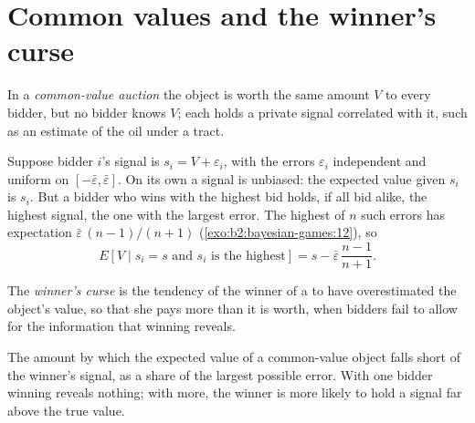 \section{Common values and the winner's curse}\label{sec:b2:bayesian-games:common}

\begin{definition}\label{def:b2:bayesian-games:common-value}
In a \emph{common-value auction} the object is worth the same amount $V$ to every bidder,
but no bidder knows $V$; each holds a private signal correlated with it, such as an estimate of the oil under a tract.
\end{definition}

Suppose bidder $i$'s signal is $s_i = V + \varepsilon_i$, with the errors $\varepsilon_i$ independent and uniform on $[-\bar\varepsilon, \bar\varepsilon]$. On its own a
signal is unbiased: the expected value given $s_i$ is $s_i$. But a bidder who wins with the highest bid holds, if all bid
alike, the highest signal, the one with the largest error. The highest of $n$ such errors has expectation
$\bar\varepsilon\,(n - 1)/(n + 1)$ (\cref{exo:b2:bayesian-games:12}), so
\[
E[V \mid s_i = s \text{ and } s_i \text{ is the highest}] = s - \bar\varepsilon\,\frac{n - 1}{n + 1}.
\]

\begin{definition}\label{def:b2:bayesian-games:winners-curse}
The \emph{winner's curse} is the tendency of the winner of a  to have
overestimated the object's value, so that she pays more than it is worth, when bidders fail to allow for the
information that winning reveals.
\end{definition}

\begin{omfigure}

{\small The amount by which the expected value of a common-value object falls short of the winner's signal, as a share of
the largest possible error. With one bidder winning reveals nothing; with more, the winner is more likely to hold a signal
far above the true value.}
\end{omfigure}

